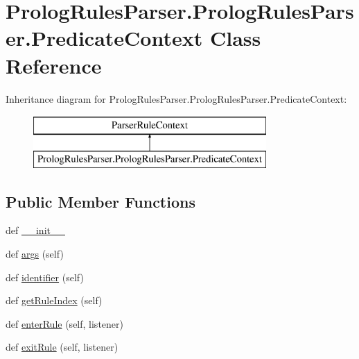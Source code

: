 \hypertarget{class_prolog_rules_parser_1_1_prolog_rules_parser_1_1_predicate_context}{}\section{Prolog\+Rules\+Parser.\+Prolog\+Rules\+Parser.\+Predicate\+Context Class Reference}
\label{class_prolog_rules_parser_1_1_prolog_rules_parser_1_1_predicate_context}
Inheritance diagram for Prolog\+Rules\+Parser.\+Prolog\+Rules\+Parser.\+Predicate\+Context\+:\begin{figure}[H]
\begin{center}
\leavevmode
\includegraphics[height=2.000000cm]{class_prolog_rules_parser_1_1_prolog_rules_parser_1_1_predicate_context}
\end{center}
\end{figure}
\subsection*{Public Member Functions}
\begin{DoxyCompactItemize}
\item 
def \hyperlink{class_prolog_rules_parser_1_1_prolog_rules_parser_1_1_predicate_context_aa48fa3461c699520ceb02fc3faaae299}{\+\_\+\+\_\+init\+\_\+\+\_\+}
\item 
def \hyperlink{class_prolog_rules_parser_1_1_prolog_rules_parser_1_1_predicate_context_a1bae8b296f983c87c8cb5e5fc068be0f}{args} (self)
\item 
def \hyperlink{class_prolog_rules_parser_1_1_prolog_rules_parser_1_1_predicate_context_abd2fe75241cd23061984ace6734dc365}{identifier} (self)
\item 
def \hyperlink{class_prolog_rules_parser_1_1_prolog_rules_parser_1_1_predicate_context_ae7f34c611fba109e6f7eb8a4b987a3bc}{get\+Rule\+Index} (self)
\item 
def \hyperlink{class_prolog_rules_parser_1_1_prolog_rules_parser_1_1_predicate_context_a484ce1be14b5a667964a1658a7ac85ef}{enter\+Rule} (self, listener)
\item 
def \hyperlink{class_prolog_rules_parser_1_1_prolog_rules_parser_1_1_predicate_context_a3a4938688db551965ec17f47b9ba6f0a}{exit\+Rule} (self, listener)
\end{DoxyCompactItemize}
